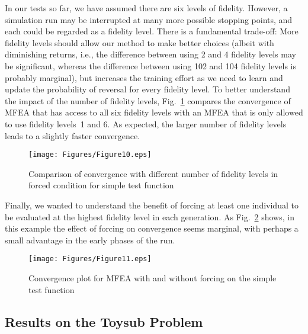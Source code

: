 In our tests so far, we have assumed there are six levels of fidelity. However, a simulation run may be interrupted at many more possible stopping points, and each could be regarded as a fidelity level. There is a fundamental trade-off: More fidelity levels should allow our method to make better choices (albeit with diminishing returns, i.e., the difference between using 2 and 4 fidelity levels may be significant, whereas the difference between using 102 and 104 fidelity levels is probably marginal), but increases the training effort as we need to learn and update the probability of reversal for every fidelity level. To better understand the impact of the number of fidelity levels, Fig.~\ref{fig:testfidForcing} compares the convergence of MFEA that has access to all six fidelity levels with an MFEA that is only allowed to use fidelity levels~1 and 6. As expected, the larger number of fidelity levels leads to a slightly faster convergence.

\begin{figure}[!htb]
	\centering
	\texttt{[image: Figures/Figure10.eps]}
	\caption{Comparison of convergence with different number of fidelity levels in forced condition for simple test function}
	\label{fig:testfidForcing}
\end{figure}

Finally, we wanted to understand the benefit of forcing at least one individual to be evaluated at the highest fidelity level in each generation. As Fig.~\ref{fig:simpleForcing} shows, in this example the effect of forcing on convergence seems marginal, with perhaps a small advantage in the early phases of the run.

\begin{figure}[!htb]
	\centering
	\texttt{[image: Figures/Figure11.eps]}
	\caption{Convergence plot for MFEA with and without forcing on the simple test function}
	\label{fig:simpleForcing}
\end{figure} 

\subsection{Results on the Toysub Problem}

